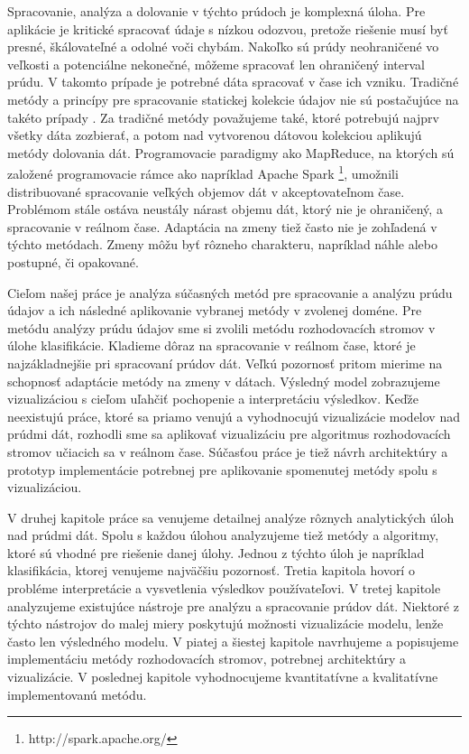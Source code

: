 \par
Spracovanie, analýza a dolovanie v týchto prúdoch je komplexná úloha. Pre aplikácie je kritické spracovať údaje s nízkou odozvou, pretože riešenie musí byť presné, škálovateľné a odolné voči chybám. Nakoľko sú prúdy neohraničené vo veľkosti a potenciálne nekonečné, môžeme spracovať len ohraničený interval prúdu. V takomto prípade je potrebné dáta spracovať v čase ich vzniku. Tradičné metódy a princípy pre spracovanie statickej kolekcie údajov nie sú postačujúce na takéto prípady \citep{krempl2014open, han2011data}. Za tradičné metódy považujeme také, ktoré potrebujú najprv všetky dáta zozbierať, a potom nad vytvorenou dátovou kolekciou aplikujú metódy dolovania dát. Programovacie paradigmy ako MapReduce, na ktorých sú založené programovacie rámce ako napríklad Apache Spark \footnote{http://spark.apache.org/}, umožnili distribuované spracovanie veľkých objemov dát v akceptovateľnom čase. Problémom stále ostáva neustály nárast objemu dát, ktorý nie je ohraničený, a spracovanie v reálnom čase. Adaptácia na zmeny tiež často nie je zohľadená v týchto metódach. Zmeny môžu byť rôzneho charakteru, napríklad náhle alebo postupné, či opakované.
\par
Cieľom našej práce je analýza súčasných metód pre spracovanie a analýzu prúdu údajov a ich následné aplikovanie vybranej metódy v zvolenej doméne. Pre metódu analýzy prúdu údajov sme si zvolili metódu rozhodovacích stromov v úlohe klasifikácie. Kladieme dôraz na spracovanie v reálnom čase, ktoré je najzákladnejšie pri spracovaní prúdov dát. Veľkú pozornosť pritom mierime na schopnosť adaptácie metódy na zmeny v dátach. Výsledný model zobrazujeme vizualizáciou s cieľom uľahčiť pochopenie a interpretáciu výsledkov. Keďže neexistujú práce, ktoré sa priamo venujú a vyhodnocujú vizualizácie modelov nad prúdmi dát, rozhodli sme sa aplikovať vizualizáciu pre algoritmus rozhodovacích stromov učiacich sa v reálnom čase. Súčasťou práce je tiež návrh architektúry a prototyp implementácie potrebnej pre aplikovanie spomenutej metódy spolu s vizualizáciou.
\par
V druhej kapitole práce sa venujeme detailnej analýze rôznych analytických úloh nad prúdmi dát. Spolu s každou úlohou analyzujeme tiež metódy a algoritmy, ktoré sú vhodné pre riešenie danej úlohy. Jednou z týchto úloh je napríklad klasifikácia, ktorej venujeme	najväčšiu pozornosť. Tretia kapitola hovorí o probléme interpretácie a vysvetlenia výsledkov používateľovi. V tretej kapitole analyzujeme existujúce nástroje pre analýzu a spracovanie prúdov dát. Niektoré z týchto nástrojov do malej miery poskytujú možnosti vizualizácie modelu, lenže často len výsledného modelu. V piatej a šiestej kapitole navrhujeme a popisujeme implementáciu metódy rozhodovacích stromov, potrebnej architektúry a vizualizácie. V poslednej kapitole vyhodnocujeme kvantitatívne a kvalitatívne implementovanú metódu.










